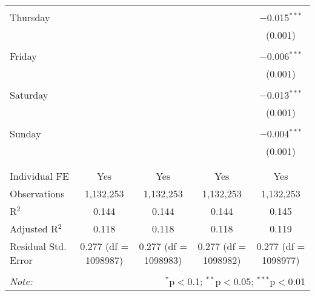 \documentclass[
]{article}
\begin{document}
\begin{table}[!htbp]
{\begin{tabular}{@{\extracolsep{5pt}}lcccc}
  & & & & \\ 
 Thursday &  &  &  & $-$0.015$^{***}$ \\ 
  &  &  &  & (0.001) \\ 
  & & & & \\ 
 Friday &  &  &  & $-$0.006$^{***}$ \\ 
  &  &  &  & (0.001) \\ 
  & & & & \\ 
 Saturday &  &  &  & $-$0.013$^{***}$ \\ 
  &  &  &  & (0.001) \\ 
  & & & & \\ 
 Sunday &  &  &  & $-$0.004$^{***}$ \\ 
  &  &  &  & (0.001) \\ 
  & & & & \\ 
\hline \\[-1.8ex] 
Individual FE & Yes & Yes & Yes & Yes \\ 
Observations & 1,132,253 & 1,132,253 & 1,132,253 & 1,132,253 \\ 
R$^{2}$ & 0.144 & 0.144 & 0.144 & 0.145 \\ 
Adjusted R$^{2}$ & 0.118 & 0.118 & 0.118 & 0.119 \\ 
Residual Std. Error & 0.277 (df = 1098987) & 0.277 (df = 1098983) & 0.277 (df = 1098982) & 0.277 (df = 1098977) \\ 
\hline 
\hline \\[-1.8ex] 
\textit{Note:}  & \multicolumn{4}{r}{$^{*}$p$<$0.1; $^{**}$p$<$0.05; $^{***}$p$<$0.01} \\ 
\end{tabular}
} 
\end{table} 
\newpage
\end{document}
